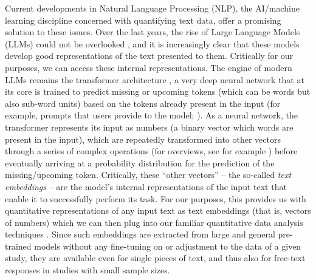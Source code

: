 \documentclass[man,floatsintext]{apa7}
\newcommand{\change}[1]{#1}
\begin{document}
Current developments in Natural Language Processing (NLP), the AI/machine learning discipline concerned with quantifying text data, offer a promising solution to these issues. Over the last years, the rise of Large Language Models (LLMs) could not be overlooked \parencite{brown2020language,demszky2023using}, and it \change{is increasingly clear} that these models develop good representations of the text presented to them. Critically for our purposes, we can access these internal representations. The engine of modern LLMs remains the transformer architecture \parencite{Vaswani2017}, a very deep neural network that at its core is trained to predict missing or upcoming tokens (which can be words but also sub-word units) based on the  tokens already present in the input (for example, prompts that users provide to the model; \cite{Devlin:2019,brown2020language}). As a neural network, the transformer represents its input as numbers (a binary vector which words are present in the input), which are repeatedly transformed into other vectors through a series of complex operations (for overviews, see for example \cite{Cassani2023,gunther2026large}) before eventually arriving at a probability distribution for the prediction of the missing/upcoming token. Critically, these ``other vectors'' -- the so-called \emph{text embeddings} -- are the model's internal representations of the input text that enable it to successfully perform its task. For our purposes, this provides us with quantitative representations of any input text as text embeddings (that is, vectors of numbers) which we can then plug into our familiar quantitative data analysis techniques \parencite{debelak2025embeddings,Kjell2019,kjell2023text}. \change{Since such embeddings are extracted from large and general pre-trained models without any fine-tuning on or adjustment to the data of a given study, they are available even for single pieces of text, and thus also for free-text responses in studies with small sample sizes.}
\end{document}
